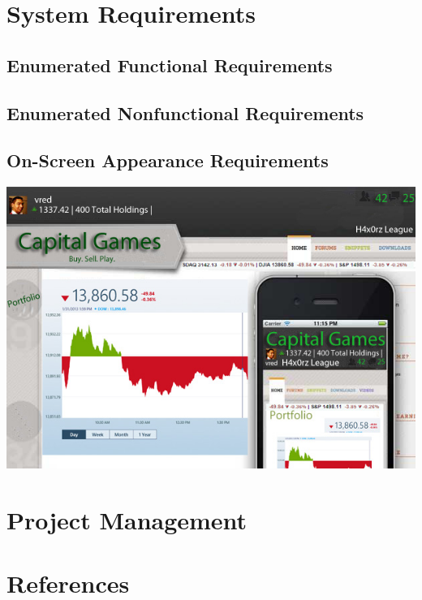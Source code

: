 \chapter{System Requirements}

\section{Enumerated Functional Requirements}

\section{Enumerated Nonfunctional Requirements}

\section{On-Screen Appearance Requirements}
\centering
\includegraphics[width=5.5in]{./img/responsiveenough.jpg}

\chapter*{Project Management}
	
\chapter*{References}
